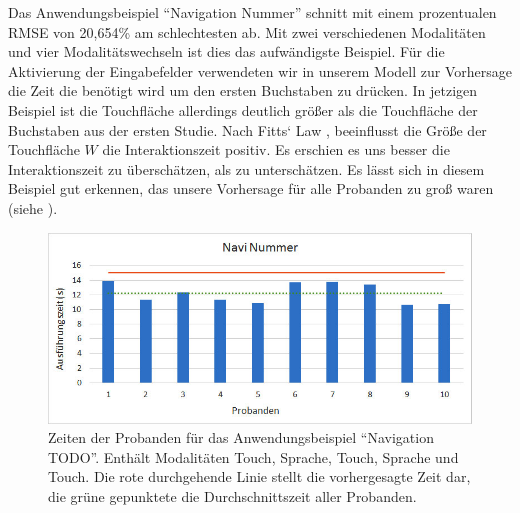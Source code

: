 Das Anwendungsbeispiel "`Navigation Nummer"' schnitt mit einem prozentualen RMSE von 20,654\% am schlechtesten ab.
Mit zwei verschiedenen Modalitäten und vier Modalitätswechseln ist dies das aufwändigste Beispiel.
Für die Aktivierung der Eingabefelder verwendeten wir in unserem Modell zur Vorhersage die Zeit die benötigt wird um den ersten Buchstaben zu drücken.
In jetzigen Beispiel ist die Touchfläche allerdings deutlich größer als die Touchfläche der Buchstaben aus der ersten Studie.
Nach Fitts` Law \citep{fitts1954information}, \citep{sasangohar2009evaluation} beeinflusst die Größe der Touchfläche $W$ die Interaktionszeit positiv.
Es erschien es uns besser die Interaktionszeit zu überschätzen, als zu unterschätzen.
Es lässt sich in diesem Beispiel gut erkennen, das unsere Vorhersage für alle Probanden zu groß waren (siehe ).
\begin{figure}[ht]
	\centering
		\includegraphics[width=1\textwidth]{img/Navi_Times.jpg}
	\caption[Zeiten der Probanden für das Anwendungsbeispiel "`Navigation TODO"'.]{Zeiten der Probanden für das Anwendungsbeispiel "`Navigation TODO"'. Enthält Modalitäten Touch, Sprache, Touch, Sprache und Touch. Die rote durchgehende Linie stellt die vorhergesagte Zeit dar, die grüne gepunktete die Durchschnittszeit aller Probanden.}
	\label{fig:Navi_Times}
\end{figure}

